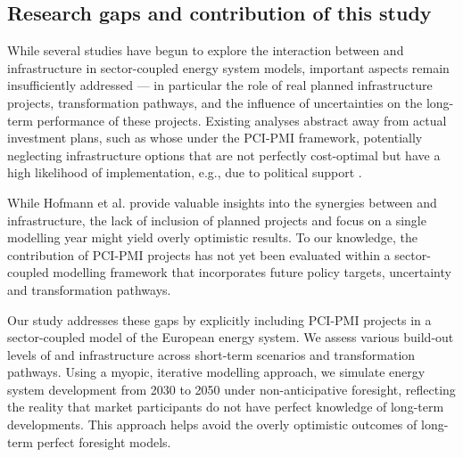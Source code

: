 \documentclass[preprint,12pt,sort&compress]{elsarticle}
\begin{document}
\subsection{Research gaps and contribution of this study}
\label{sec:research_gaps_contribution}
While several studies have begun to explore the interaction between  and  infrastructure in sector-coupled energy system models, important aspects remain insufficiently addressed --- in particular the role of real planned infrastructure projects, transformation pathways, and the influence of uncertainties on the long-term performance of these projects. Existing analyses abstract away from actual investment plans, such as whose under the PCI-PMI framework, potentially neglecting infrastructure options that are not perfectly cost-optimal but have a high likelihood of implementation, e.g., due to political support \cite{vangreevenbroekLittleLoseCase2025,trutnevyteDoesCostOptimization2016}. 

While Hofmann et al. \cite{hofmannH2CO2Network2025} provide valuable insights into the synergies between  and  infrastructure, the lack of inclusion of planned projects and focus on a single modelling year might yield overly optimistic results. To our knowledge, the contribution of PCI-PMI projects has not yet been evaluated within a sector-coupled modelling framework that incorporates future policy targets, uncertainty and transformation pathways.

Our study addresses these gaps by explicitly including PCI-PMI projects in a sector-coupled model of the European energy system. We assess various build-out levels of  and  infrastructure across short-term scenarios and transformation pathways. Using a myopic, iterative modelling approach, we simulate energy system development from 2030 to 2050 under non-anticipative foresight, reflecting the reality that market participants do not have perfect knowledge of long-term developments. This approach helps avoid the overly optimistic outcomes of long-term perfect foresight models.
\end{document}
